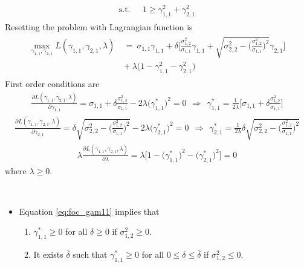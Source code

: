 \documentclass[14pt]{article}
\begin{document}
{\begin{eqnarray}
\begin{aligned}
\text{s.t.} \ \ & \ 1 \geq \gamma_{1,1}^2 + \gamma_{2,1}^2
\end{aligned}
\end{eqnarray}
Resetting the problem with Lagrangian function is
\begin{eqnarray}\label{eq:lagrangian}
\begin{aligned}
\max_{\gamma_{1,1},\gamma_{2,1}} L(\gamma_{1,1},\gamma_{2,1},\lambda) \ &= \  \sigma_{1,1} \gamma_{1,1} + \delta \Bigg[ \frac{\sigma_{1,2}^2}{\sigma_{1,1}}  \gamma_{1,1} + \sqrt{\sigma_{2,2}^2 - \Big( \frac{\sigma_{1,2}^2}{\sigma_{1,1}} \Big)^2} \gamma_{2,1}   \Bigg] \\
\ &+ \ \lambda \big(1 - \gamma_{1,1}^2 - \gamma_{2,1}^2 \big)
\end{aligned}
\end{eqnarray}
First order conditions are
\begin{eqnarray}\label{eq:foc_gam11}
\frac{\partial L(\gamma_{1,1},\gamma_{2,1},\lambda) }{\partial \gamma_{1,1}} = \sigma_{1,1} + \delta\frac{\sigma_{1,2}^2}{\sigma_{1,1}} - 2 \lambda \big( \gamma_{1,1}^* \big)^2 = 0 \ \ \Rightarrow \ \ \gamma_{1,1}^* = \frac{1}{2 \lambda} \bigg[ \sigma_{1,1} +  \delta\frac{\sigma_{1,2}^2}{\sigma_{1,1}}  \bigg]
\end{eqnarray}
\begin{eqnarray}\label{eq:foc_gam21}
\frac{\partial L(\gamma_{1,1},\gamma_{2,1},\lambda) }{\partial \gamma_{2,1}} = \delta \sqrt{\sigma_{2,2}^2 - \Big( \frac{\sigma_{1,2}^2}{\sigma_{1,1}} \Big)^2} - 2 \lambda \big( \gamma_{2,1}^* \big)^2 = 0 \ \ \Rightarrow \ \ \gamma_{2,1}^* =  \frac{1}{2 \lambda} \delta \sqrt{\sigma_{2,2}^2 - \Big( \frac{\sigma_{1,2}^2}{\sigma_{1,1}} \Big)^2}
\end{eqnarray}
\begin{eqnarray}\label{eq:complslackness}
\lambda \frac{\partial L(\gamma_{1,1},\gamma_{2,1},\lambda) }{\partial \lambda} = \lambda\big[ 1 - \big( \gamma_{1,1}^* \big)^2 - \big( \gamma_{2,1}^* \big)^2 \big] = 0
\end{eqnarray}
where $\lambda \geq 0$.

\

\begin{itemize}
\item Equation \ref{eq:foc_gam11} implies that
\begin{enumerate}
	\item $\gamma_{1,1}^* \geq 0$ for all $\delta \geq 0$ if $\sigma_{1,2}^2 \geq 0$.
	\item It exists $\bar{\delta}$ such that $\gamma_{1,1}^* \geq 0$ for all $0 \leq \delta \leq \bar{\delta}$ if $\sigma_{1,2}^2 \leq 0$.
\end{enumerate} 


\end{itemize}}
\end{document}
